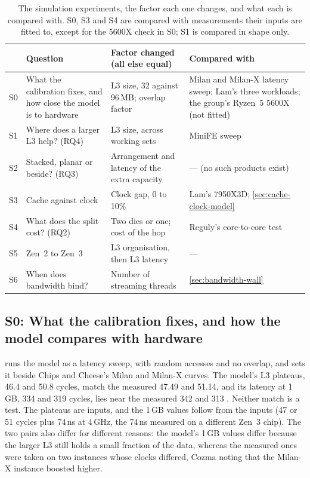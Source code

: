 \begin{table}[htbp]
  \centering
  \caption[The simulation experiments]{The simulation experiments, the factor each one changes, and what each is compared with. S0, S3 and S4 are compared with measurements their inputs are fitted to, except for the 5600X check in S0; S1 is compared in shape only.}
  \label{tab:sim-plan}
  \small
  \begin{tabularx}{\textwidth}{@{}l>{\raggedright\arraybackslash}p{3.6cm}>{\raggedright\arraybackslash}X>{\raggedright\arraybackslash}p{3.3cm}@{}}
    \toprule
    & \textbf{Question} & \textbf{Factor changed (all else equal)} & \textbf{Compared with} \\
    \midrule
    S0 & What the calibration fixes, and how close the model is to hardware & L3 size, 32 against 96\,MB; overlap factor & Milan and Milan-X latency sweep; Lam's three workloads; the group's Ryzen~5 5600X (not fitted) \\
    S1 & Where does a larger L3 help? (RQ4) & L3 size, across working sets & MiniFE sweep \\
    S2 & Stacked, planar or beside? (RQ3) & Arrangement and latency of the extra capacity & --- (no such products exist) \\
    S3 & Cache against clock & Clock gap, 0 to 10\% & Lam's 7950X3D; \cref{sec:cache-clock-model} \\
    S4 & What does the split cost? (RQ2) & Two dies or one; cost of the hop & Reguly's core-to-core test \\
    S5 & Zen~2 to Zen~3 & L3 organisation, then L3 latency & --- \\
    S6 & When does bandwidth bind? & Number of streaming threads & \cref{sec:bandwidth-wall} \\
    \bottomrule
  \end{tabularx}
\end{table}

\subsection{S0: What the calibration fixes, and how the model compares with hardware}
\label{sec:sim-calibration}
 runs the model as a latency sweep, with random accesses and no overlap, and sets it beside Chips and Cheese's Milan and Milan-X curves. The model's L3 plateaus, 46.4 and 50.8 cycles, match the measured 47.49 and 51.14, and its latency at 1\,GB, 334 and 319 cycles, lies near the measured 342 and 313 \cite{cozmaAMDsVCacheTested2022}. Neither match is a test. The plateaus are inputs, and the 1\,GB values follow from the inputs (47 or 51 cycles plus 74\,ns at 4\,GHz, the 74\,ns measured on a different Zen~3 chip). The two pairs also differ for different reasons: the model's 1\,GB values differ because the larger L3 still holds a small fraction of the data, whereas the measured ones were taken on two instances whose clocks differed, Cozma noting that the Milan-X instance boosted higher.


